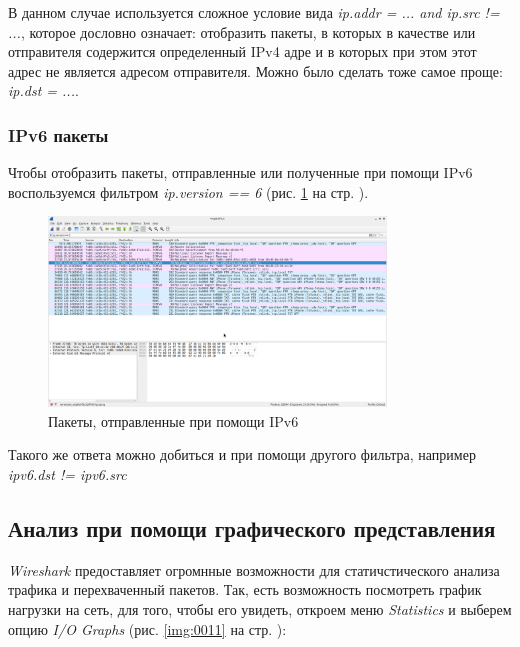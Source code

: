 \documentclass[a4paper]{article}
\begin{document}
  В данном случае используется сложное условие вида
  \textit{ip.addr = ... and ip.src != ...}, которое дословно означает:
  отобразить пакеты, в которых в качестве или отправителя содержится определенный
  IPv4 адре и в которых при этом этот адрес не является адресом отправителя.
  Можно было сделать тоже самое проще: \textit{ip.dst = ...}.

  \subsubsection{IPv6 пакеты}

  Чтобы отобразить пакеты, отправленные или полученные при помощи IPv6 воспользуемся фильтром 
  \textit{ip.version == 6} (рис. \ref{img:0010} на стр. \pageref{img:0010}).

  \begin{figure}[H]
    \centering
    \includegraphics[width=0.8\textwidth]{02_0010}
    \caption{Пакеты, отправленные при помощи IPv6}
    \label{img:0010}
  \end{figure}

  Такого же ответа можно добиться и при помощи другого фильтра, например \textit{ipv6.dst != ipv6.src}

  \subsection{Анализ при помощи графического представления}

  \textit{Wireshark} предоставляет огромнные возможности для статичстического анализа трафика
  и перехваченный пакетов. Так, есть возможность посмотреть график нагрузки на сеть, для того,
  чтобы его увидеть, откроем меню \textit{Statistics} и выберем опцию \textit{I/O Graphs}
  (рис. \ref{img:0011} на стр. \pageref{img:0011}):
\end{document}
